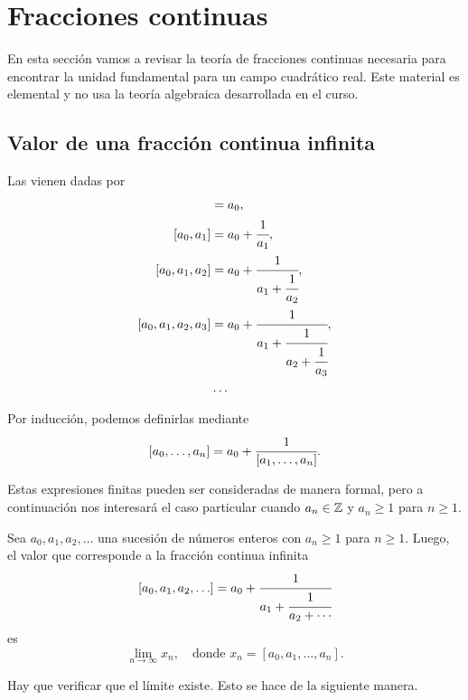 \section{Fracciones continuas}

En esta sección vamos a revisar la teoría de fracciones continuas necesaria para
encontrar la unidad fundamental para un campo cuadrático real. Este material es
elemental y no usa la teoría algebraica desarrollada en el curso.

\subsection{Valor de una fracción continua infinita}

Las  vienen dadas por
\begin{align*}
  [a_0] & = a_0, \\
  [a_0,a_1] & = a_0 + \cfrac{1}{a_1}, \\
  [a_0,a_1,a_2] & = a_0 + \cfrac{1}{a_1 + \cfrac{1}{a_2}}, \\
  [a_0,a_1,a_2,a_3] & = a_0 + \cfrac{1}{a_1 + \cfrac{1}{a_2 + \cfrac{1}{a_3}}}, \\
  & \ldots
\end{align*}

Por inducción, podemos definirlas mediante
$$[a_0, \ldots, a_n] = a_0 + \cfrac{1}{[a_1, \ldots, a_n]}.$$

Estas expresiones finitas pueden ser consideradas de manera formal, pero a
continuación nos interesará el caso particular cuando $a_n \in \mathbb{Z}$ y
$a_n \ge 1$ para $n \ge 1$.

\begin{definicion}
  Sea $a_0,a_1,a_2,\ldots$ una sucesión de números enteros con $a_n \ge 1$
  para $n \ge 1$. Luego, el valor que corresponde a la fracción continua
  infinita
  $$[a_0,a_1,a_2,\ldots] = a_0 + \cfrac{1}{a_1 + \cfrac{1}{a_2 + \cdots}}$$
  es
  $$\lim_{n\to\infty} x_n, \quad \text{donde } x_n = [a_0,a_1,\ldots,a_n].$$
\end{definicion}

Hay que verificar que el límite existe. Esto se hace de la siguiente manera.


